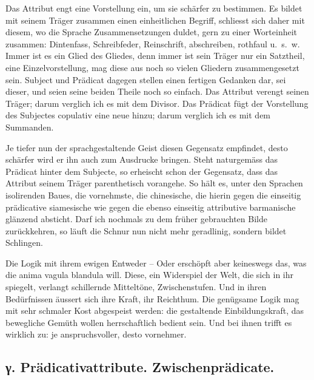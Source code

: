 
Das Attribut engt eine Vorstellung ein, um sie schärfer zu bestimmen. Es bildet mit seinem Träger zusammen einen einheitlichen Begriff, schliesst sich daher mit diesem, wo die Sprache Zusammensetzungen duldet, gern zu einer Worteinheit zusammen: Dintenfass, Schreibfeder, Reinschrift, abschreiben, rothfaul u.~s.~w. Immer ist es ein Glied des Gliedes, denn immer ist sein Träger nur ein Satztheil, eine Einzelvorstellung, mag diese aus noch so vielen Gliedern zusammen\label{fp.436}gesetzt sein. Subject und Prädicat dagegen stellen einen fertigen Gedanken dar, sei dieser, und seien seine beiden Theile noch so einfach. Das Attribut verengt seinen Träger; darum verglich ich es mit dem Divisor. Das Prädicat fügt der Vorstellung des Subjectes copulativ eine neue hinzu; darum verglich ich es mit dem Summanden.

Je tiefer nun der sprachgestaltende Geist diesen Gegensatz empfindet, desto schärfer wird er ihn auch zum Ausdrucke bringen. Steht naturgemäss das Prädicat hinter dem Subjecte, so erheischt schon der Gegensatz, dass das Attribut seinem Träger parenthetisch vorangehe. So hält es, unter den Sprachen isolirenden Baues, die vornehmste, die chinesische, die hierin gegen die einseitig prädicative siamesische wie gegen die ebenso einseitig attributive barmanische glänzend absticht. Darf ich nochmals zu dem früher gebrauchten Bilde zurückkehren, so läuft die Schnur nun nicht mehr geradlinig, sondern bildet Schlingen.

Die Logik mit ihrem ewigen Entweder – Oder erschöpft aber keineswegs das, was die anima vagula blandula will. Diese, ein Widerspiel der Welt, die sich in ihr spiegelt, verlangt schillernde Mitteltöne, Zwischenstufen. Und in ihren Bedürfnissen äussert sich ihre Kraft, ihr Reichthum. Die genügsame Logik mag mit sehr schmaler Kost abgespeist werden: die gestaltende Einbildungskraft, das bewegliche Gemüth wollen herrschaftlich bedient sein. Und bei ihnen trifft es wirklich zu: je anspruchsvoller, desto vornehmer.

\subsection*{γ. Prädicativattribute. Zwischenprädicate.}\label{IV.IV.Icgamma}

